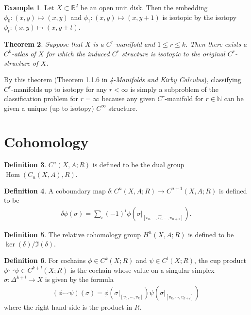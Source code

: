 \documentclass[11pt, psamsfonts]{amsart}
\newtheorem{thm}{Theorem}[section]
\theoremstyle{definition}
\newtheorem{defn}[thm]{Definition}
\newtheorem{exmp}[thm]{Example}
\theoremstyle{remark}
\DeclareMathOperator{\Hom}{Hom}
\numberwithin{equation}{section}
\begin{document}
\begin{exmp}
  Let $X \subset \mathbb{R}^2$ be an open unit disk.
  Then the embedding $\phi_0: (x, y) \mapsto (x, y)$ and $\phi_1: (x, y) \mapsto (x, y + 1)$ is isotopic by the isotopy $\phi_t: (x, y) \mapsto (x, y + t)$.
\end{exmp}

\begin{thm}
  Suppose that $X$ is a $C^r$-manifold and $1 \leq r \leq k$.
  Then there exists a $C^k$-atlas of $X$ for which the induced $C^r$ structure is isotopic to the original $C^r$-structure of $X$.
\end{thm}

By this theorem (Theorem 1.1.6 in \textit{4-Manifolds and Kirby Calculus}), classifying $C^r$-manifolds up to isotopy for any $r < \infty$ is simply a subproblem of the classification problem for $r = \infty$ because any given $C^r$-manifold for $r \in \mathbb{N}$ can be given a unique (up to isotopy) $C^{\infty}$ structure.

\section{Cohomology}

\begin{defn}
  $C^n(X, A; R)$ is defined to be the dual group $\Hom(C_n(X, A), R)$.
\end{defn}

\begin{defn}
  A coboundary map $\delta: C^n(X, A; R) \rightarrow C^{n + 1}(X, A; R)$ is defined to be
  \begin{align*}
    \delta\phi(\sigma) = \sum_i (-1)^i \phi(\sigma\vert_{[v_0, \cdots, \hat{v_i}, \cdots, v_{n + 1}]}).
  \end{align*}
\end{defn}

\begin{defn}
  The relative cohomology group $H^n(X, A; R)$ is defined to be $\ker(\delta) / \Im(\delta)$.
\end{defn}

\begin{defn}
  For cochains $\phi \in C^k(X; R)$ and $\psi \in C^l(X; R)$, the cup product $\phi \smile \psi \in C^{k + l}(X; R)$ is the cochain whose value on a singular simplex $\sigma: \Delta^{k + l} \rightarrow X$ is given by the formula
  \begin{align*}
    (\phi \smile \psi)(\sigma) = \phi(\sigma\vert_{[v_0, \cdots, v_k]})\psi(\sigma\vert_{[v_k, \cdots, v_{k + l}]})
  \end{align*}
  where the right hand-side is the product in $R$.
\end{defn}
\end{document}
